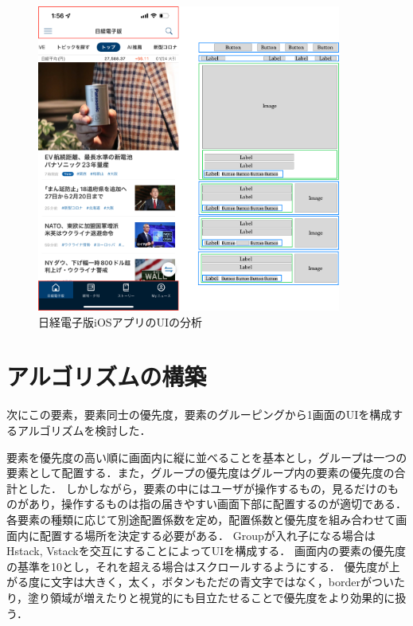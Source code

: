 \begin{figure}[htbp]
  \begin{minipage}{\hsize}
    \begin{center}
       \includegraphics[width=100mm]{img/nikkei_analyze.png}
    \end{center}
    \caption{日経電子版iOSアプリのUIの分析}
    \label{fig:nikkei_analyze}
  \end{minipage}
\end{figure}

\section{アルゴリズムの構築}
次にこの要素，要素同士の優先度，要素のグルーピングから1画面のUIを構成するアルゴリズムを検討した．

要素を優先度の高い順に画面内に縦に並べることを基本とし，グループは一つの要素として配置する．また，グループの優先度はグループ内の要素の優先度の合計とした．
しかしながら，要素の中にはユーザが操作するもの，見るだけのものがあり，操作するものは指の届きやすい画面下部に配置するのが適切である．各要素の種類に応じて別途配置係数を定め，配置係数と優先度を組み合わせて画面内に配置する場所を決定する必要がある．
Groupが入れ子になる場合はHstack, Vstackを交互にすることによってUIを構成する．
画面内の要素の優先度の基準を10とし，それを超える場合はスクロールするようにする．
優先度が上がる度に文字は大きく，太く，ボタンもただの青文字ではなく，borderがついたり，塗り領域が増えたりと視覚的にも目立たせることで優先度をより効果的に扱う．

